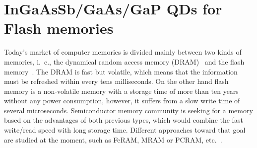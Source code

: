 
\chapter{InGaAsSb/GaAs/GaP QDs for Flash memories}\label{chap:TUB_QD}

Today's market of computer memories is divided mainly between two kinds of memories, i.~e., the dynamical random access memory (DRAM)~\citep{waser_2003} and the flash memory~\citep{Pavan_1997}. The DRAM is fast but volatile, which means that the information must be refreshed within every tens milliseconds. On the other hand flash memory is a non-volatile memory with a storage time of more than ten years without any power consumption, however, it suffers from a slow write time of several microseconds. Semiconductor memory community is seeking for a memory based on the advantages of both previous types, which would combine the fast write/read speed with long storage time. Different approaches toward that goal are studied at the moment, such as FeRAM, MRAM or PCRAM, etc.~\citep{Burr_IBM2008}.

